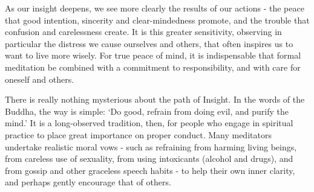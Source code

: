 
As our insight deepens, we see more clearly the results of our actions -
the peace that good intention, sincerity and clear-mindedness promote,
and the trouble that confusion and carelessness create. It is this
greater sensitivity, observing in particular the distress we cause
ourselves and others, that often inspires us to want to live more
wisely. For true peace of mind, it is indispensable that formal
meditation be combined with a commitment to responsibility, and with
care for oneself and others.

There is really nothing mysterious about the path of Insight. In the
words of the Buddha, the way is simple: `Do good, refrain from doing
evil, and purify the mind.' It is a long-observed tradition, then, for
people who engage in spiritual practice to place great importance on
proper conduct. Many meditators undertake realistic moral vows - such as
refraining from harming living beings, from careless use of sexuality,
from using intoxicants (alcohol and drugs), and from gossip and other
graceless speech habits - to help their own inner clarity, and perhaps
gently encourage that of others.
